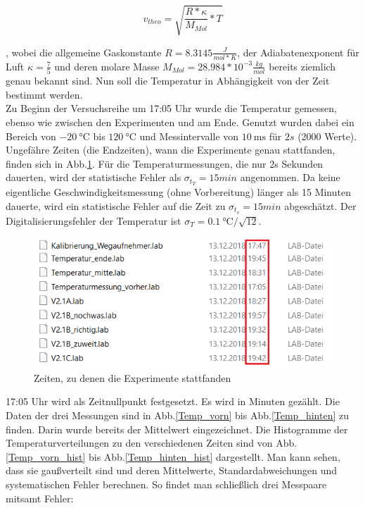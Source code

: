 \documentclass[]{article}
\begin{document}
	\begin{equation}
	v_{theo}=\sqrt{\frac{R*\kappa}{M_{Mol}}*T}
	\label{v(T)}
	\end{equation}
	
	, wobei die allgemeine Gaskonstante $R=8.3145 \frac{J}{mol*K}$, der Adiabatenexponent für Luft $\kappa=\frac{7}{5}$ und deren molare Masse $M_{Mol}=28.984*10^{-3} \frac{kg}{mol}$ bereits ziemlich genau bekannt sind.
	Nun soll die Temperatur in Abhängigkeit von der Zeit bestimmt werden.\\
	Zu Beginn der Versuchsreihe um 17:05 Uhr wurde die Temperatur gemessen, ebenso wie zwischen den Experimenten und am Ende. Genutzt wurden dabei ein Bereich von $\SI{-20}{\celsius}$ bis $\SI{120}{\celsius}$ und Messintervalle von $\SI{10}{\milli\second}$ für $2s$ (2000 Werte).
	Ungefähre Zeiten (die Endzeiten), wann die Experimente genau stattfanden, finden sich in Abb.\ref{Temp_Zeiten}. Für die Temperaturmessungen, die nur 2s Sekunden dauerten, wird der statistische Fehler als $\sigma_{t_T}=15min$ angenommen. Da keine eigentliche Geschwindigkeitsmessung (ohne Vorbereitung) länger als 15 Minuten dauerte, wird ein statistische Fehler auf die Zeit zu $\sigma_{t_v}=15min$ abgeschätzt. Der Digitalisierungsfehler der Temperatur ist $\sigma_T=\SI{0.1}{\celsius}/\sqrt{12}$.\\
	
	\begin{figure}
		\begin{center}
			\includegraphics[scale=0.9]{Images/Messreihenendzeiten.png}
			\caption{Zeiten, zu denen die Experimente stattfanden}
			\label{Temp_Zeiten}
		\end{center}
	\end{figure}
	17:05 Uhr wird als Zeitnullpunkt festgesetzt. Es wird in Minuten gezählt. Die Daten der drei Messungen sind in Abb.\ref{Temp_vorn} bis Abb.\ref{Temp_hinten} zu finden. Darin wurde bereits der Mittelwert eingezeichnet. Die Histogramme der Temperaturverteilungen zu den verschiedenen Zeiten sind von Abb.\ref{Temp_vorn_hist}
 	bis Abb.\ref{Temp_hinten_hist} dargestellt. Man kann sehen, dass sie gaußverteilt sind und deren Mittelwerte, Standardabweichungen und systematischen Fehler berechnen. So findet man schließlich drei Messpaare mitsamt Fehler:
 	
\end{document}
